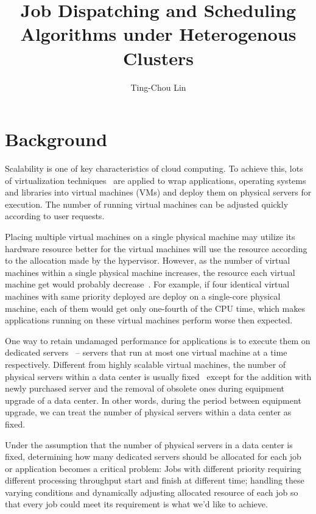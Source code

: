 \documentclass[11pt]{article}
\title{\textbf{Job Dispatching and Scheduling Algorithms under Heterogenous Clusters}}
\author{Ting-Chou Lin\\}
\date{}
\begin{document}
\maketitle

\section{Background}

Scalability is one of key characteristics of cloud computing.  To
achieve this, lots of virtualization
techniques~\cite{secure_virt_for_cloud, cloud_issue} are applied to wrap
applications, operating systems and libraries into virtual machines
(VMs) and deploy them on physical servers for execution.  The number of
running virtual machines can be adjusted quickly according to user
requests.

Placing multiple virtual machines on a single physical machine may
utilize its hardware resource better for the virtual machines will use
the resource according to the allocation made by the hypervisor.
However, as the number of virtual machines within a single physical
machine increases, the resource each virtual machine get would probably
decrease~\cite{resource_overbooking}.  For example, if four identical
virtual machines with same priority deployed are deploy on a single-core
physical machine, each of them would get only one-fourth of the CPU
time, which makes applications running on these virtual machines perform
worse then expected.

One way to retain undamaged performance for applications is to execute
them on dedicated servers~\cite{dedicated_hosting} -- servers that run
at most one virtual machine at a time respectively.  Different from
highly scalable virtual machines, the number of physical servers within
a data center is usually fixed~\cite{maintenance} except for the
addition with newly purchased server and the removal of obsolete ones
during equipment upgrade of a data center.  In other words, during the
period between equipment upgrade, we can treat the number of physical
servers within a data center as fixed.

Under the assumption that the number of physical servers in a data
center is fixed, determining how many dedicated servers should be
allocated for each job or application becomes a critical problem:  Jobs
with different priority requiring different processing throughput start
and finish at different time; handling these varying conditions and
dynamically adjusting allocated resource of each job so that every job
could meet its requirement is what we'd like to achieve.
\end{document}
